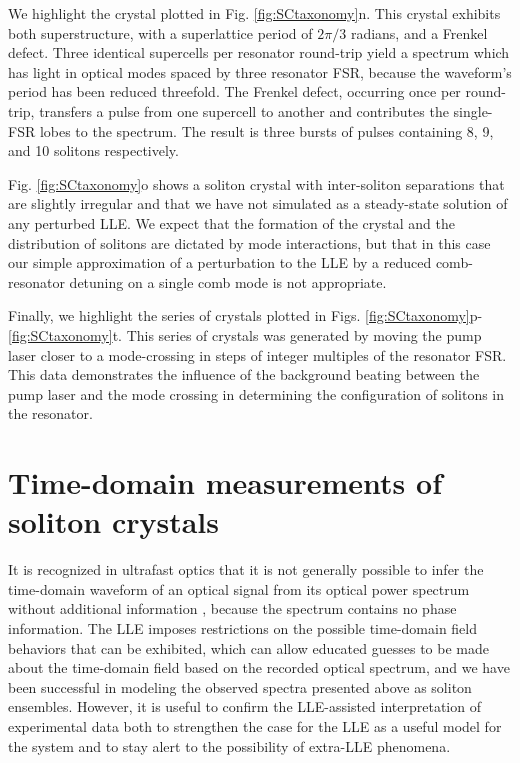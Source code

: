 We highlight the crystal plotted in Fig. \ref{fig:SCtaxonomy}n. This crystal exhibits both superstructure, with a superlattice period of $2\pi/3$ radians, and a Frenkel defect. Three identical supercells per resonator round-trip yield a spectrum which has light in optical modes spaced by three resonator FSR, because the waveform's period has been reduced threefold. The Frenkel defect, occurring once per round-trip, transfers a pulse from one supercell to another and contributes the single-FSR lobes to the spectrum. The result is three bursts of pulses containing 8, 9, and 10 solitons respectively. 	

Fig. \ref{fig:SCtaxonomy}o shows a soliton crystal with inter-soliton separations that are slightly irregular and that we have not simulated as a steady-state solution of any perturbed LLE. We expect that the formation of the crystal and the distribution of solitons are dictated by mode interactions, but that in this case our simple approximation of a perturbation to the LLE by a reduced comb-resonator detuning on a single comb mode is not appropriate.

Finally, we highlight the series of crystals plotted in Figs. \ref{fig:SCtaxonomy}p-\ref{fig:SCtaxonomy}t. This series of crystals was generated by moving the pump laser closer to a mode-crossing in steps of integer multiples of the resonator FSR. This data demonstrates the influence of the background beating between the pump laser and the mode crossing in determining the configuration of solitons in the resonator.





\section{Time-domain measurements of soliton crystals}
It is recognized in ultrafast optics that it is not generally possible to infer the time-domain waveform of an optical signal from its optical power spectrum without additional information \cite{Weiner2009}, because the spectrum contains no phase information. The LLE imposes restrictions on the possible time-domain field behaviors that can be exhibited, which can allow educated guesses to be made about the time-domain field based on the recorded optical spectrum, and we have been successful in modeling the observed spectra presented above as soliton ensembles. However, it is useful to confirm the LLE-assisted interpretation of experimental data both to strengthen the case for the LLE as a useful model for the system and to stay alert to the possibility of extra-LLE phenomena. 

